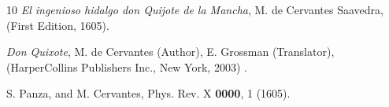 \documentclass[11pt,a4paper]{article}
\begin{document}
\setlength{\parskip}{\smallskipamount}
\noindent 

\begin{thebibliography}{10}
\textit{El ingenioso hidalgo don Quijote de la Mancha}, M. de Cervantes Saavedra, (First Edition, 1605).

\textit{Don Quixote}, M. de Cervantes (Author), E. Grossman (Translator), (HarperCollins Publishers Inc., New York, 2003) .

S. Panza, and M. Cervantes, Phys. Rev. X {\bf 0000}, 1 (1605).


\end{thebibliography}
\end{document}
